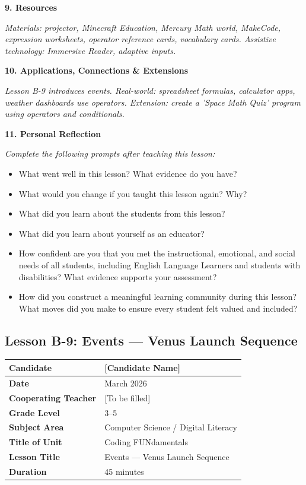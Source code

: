 \documentclass[11pt,letterpaper]{article}
\begin{document}
\textbf{9. Resources}

\textit{Materials: projector, Minecraft Education, Mercury Math world, MakeCode, expression worksheets, operator reference cards, vocabulary cards. Assistive technology: Immersive Reader, adaptive inputs.}

\textbf{10. Applications, Connections \& Extensions}

\textit{Lesson B-9 introduces events. Real-world: spreadsheet formulas, calculator apps, weather dashboards use operators. Extension: create a 'Space Math Quiz' program using operators and conditionals.}

\textbf{11. Personal Reflection}

\textit{Complete the following prompts after teaching this lesson:}

\begin{itemize}
  \item What went well in this lesson? What evidence do you have?

  \item What would you change if you taught this lesson again? Why?

  \item What did you learn about the students from this lesson?

  \item What did you learn about yourself as an educator?

  \item How confident are you that you met the instructional, emotional, and social needs of all students, including English Language Learners and students with disabilities? What evidence supports your assessment?

  \item How did you construct a meaningful learning community during this lesson? What moves did you make to ensure every student felt valued and included?
\end{itemize}

\newpage
\subsection{Lesson B-9: Events --- Venus Launch Sequence}
\label{sub:LessonB9EventsVenusLaunchSequence}

\begin{longtable}{|L{0.28\textwidth}|L{0.65\textwidth}|}
\hline
\textbf{Candidate}  & [Candidate Name]  \\
\hline
\textbf{Date}  & March 2026  \\
\hline
\textbf{Cooperating Teacher}  & [To be filled]  \\
\hline
\textbf{Grade Level}  & 3--5  \\
\hline
\textbf{Subject Area}  & Computer Science / Digital Literacy  \\
\hline
\textbf{Title of Unit}  & Coding FUNdamentals  \\
\hline
\textbf{Lesson Title}  & Events --- Venus Launch Sequence  \\
\hline
\textbf{Duration}  & 45 minutes  \\
\hline
\end{longtable}
\end{document}
